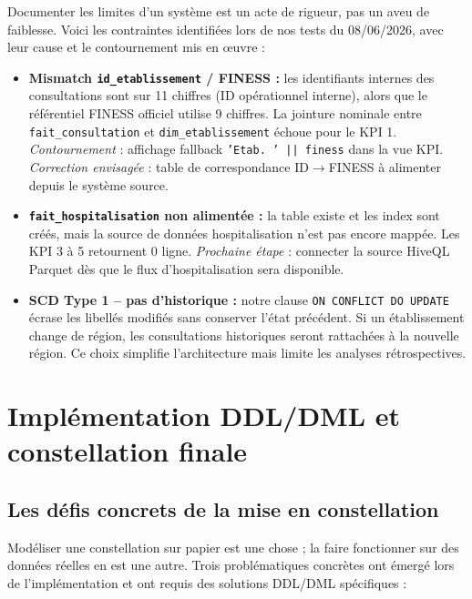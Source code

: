 \documentclass[12pt,a4paper]{report}
\begin{document}
Documenter les limites d'un système est un acte de rigueur, pas un aveu de faiblesse. Voici les contraintes identifiées lors de nos tests du 08/06/2026, avec leur cause et le contournement mis en \oe uvre :

\begin{warningbox}
\begin{itemize}
    \item \textbf{Mismatch \texttt{id\_etablissement} / FINESS :} les identifiants internes des consultations sont sur 11 chiffres (ID opérationnel interne), alors que le référentiel FINESS officiel utilise 9 chiffres. La jointure nominale entre \texttt{fait\_consultation} et \texttt{dim\_etablissement} échoue pour le KPI 1. \textit{Contournement} : affichage fallback \texttt{'Etab. ' || finess} dans la vue KPI. \textit{Correction envisagée} : table de correspondance ID$\rightarrow$FINESS à alimenter depuis le système source.
    \item \textbf{\texttt{fait\_hospitalisation} non alimentée :} la table existe et les index sont créés, mais la source de données hospitalisation n'est pas encore mappée. Les KPI 3 à 5 retournent 0 ligne. \textit{Prochaine étape} : connecter la source HiveQL Parquet dès que le flux d'hospitalisation sera disponible.
    \item \textbf{SCD Type 1 -- pas d'historique :} notre clause \texttt{ON CONFLICT DO UPDATE} écrase les libellés modifiés sans conserver l'état précédent. Si un établissement change de région, les consultations historiques seront rattachées à la nouvelle région. Ce choix simplifie l'architecture mais limite les analyses rétrospectives.
\end{itemize}
\end{warningbox}

\clearpage
\section{Implémentation DDL/DML et constellation finale}

\subsection{Les défis concrets de la mise en constellation}
Modéliser une constellation sur papier est une chose ; la faire fonctionner sur des données réelles en est une autre. Trois problématiques concrètes ont émergé lors de l'implémentation et ont requis des solutions DDL/DML spécifiques :
\end{document}
